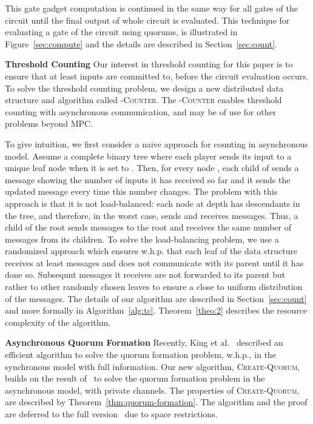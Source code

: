 \documentclass[10pt]{llncs}
\newcommand{\whp}{w.h.p.\xspace}
\newcommand{\tc}{\textsc{-Counter}\xspace}
\newcommand{\cq}{\textsc{Create-Quorum}\xspace}
\begin{document}
This gate gadget computation is continued in the same way for all
gates of the circuit until the final output of whole circuit is
evaluated.  This technique for evaluating a gate of the circuit using
quorums, is illustrated in Figure~\ref{sec:compute} and the details
are described in Section~\ref{sec:count}.  

\smallskip
\noindent
{\bf Threshold Counting}
Our interest in threshold counting for this paper is to ensure that at
least  inputs are committed to, before the circuit evaluation occurs. 
To solve the threshold counting problem, we design a new distributed data 
structure and algorithm
called \tc. The \tc enables threshold counting with 
asynchronous communication, and may be of use for other problems beyond MPC. 

To give intuition, we first consider a naive approach
for counting in asynchronous model. Assume a complete binary tree where 
each player sends its input to a unique leaf node when it is set to . 
Then, for every node , each child of  sends  a message showing 
the number of inputs it has received so far and it sends the updated 
message every time this number changes. The
problem with this approach is that it is not load-balanced: each node
at depth  has  descendants in the tree, and
therefore, in the worst case, sends and receives 
messages. Thus, a child of the root sends  messages to the root
and receives the same number of messages from its children. To solve
the load-balancing problem, we use a randomized approach which ensures 
\whp that each leaf of the data structure receives at least  
messages and does not communicate with its parent until it has done so.
Subsequnt messages it receives are not forwarded to its parent but rather 
to other randomly chosen leaves to ensure a close to uniform distribution 
of the messages. The details of our algorithm are described in 
Section~\ref{sec:count} and more formally in
Algorithm~\ref{alg:tc}. Theorem~\ref{theo:2} describes the resource complexity 
of the algorithm.



\smallskip
\noindent
{\bf Asynchronous Quorum Formation} 
 Recently, King et al.~\cite{ICDCN11} described an efficient algorithm
 to solve the quorum formation problem, \whp, in the synchronous model
 with full information. Our new algorithm, \cq, builds on the result
 of~\cite{ICDCN11} to solve the quorum formation problem in the
 asynchronous model, with private channels. The properties of \cq, are
 described by Theorem~\ref{thm:quorum-formation}. The algorithm and
 the proof  are deferred to the full version~\cite{dkms2013} due to space 
restrictions.
\end{document}
